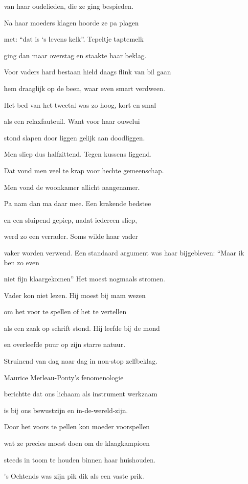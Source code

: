 van haar oudelieden,
die ze ging bespieden.

Na haar moeders klagen
hoorde ze pa plagen

met: “dat is ‘s levens kelk”.
Tepeltje taptemelk

ging dan maar overstag
en staakte haar beklag.

Voor vaders hard bestaan
hield daags flink van bil gaan

hem draaglijk op de been,
waar even smart verdween.

Het bed van het tweetal
was zo hoog, kort en smal

als een relaxfauteuil.
Want voor haar ouwelui

stond slapen door liggen
gelijk aan doodliggen.

Men sliep dus halfzittend.
Tegen kussens liggend.

Dat vond men veel te krap
voor hechte gemeenschap.

Men vond de woonkamer
allicht aangenamer.

Pa nam dan ma daar mee.
Een krakende bedstee

en een sluipend gepiep,
nadat iedereen sliep,

werd zo een verrader.
Soms wilde haar vader

vaker worden verwend.
Een standaard argument
was haar bijgebleven:
“Maar ik ben zo even

niet fijn klaargekomen”
Het moest nogmaals stromen.

Vader kon niet lezen.
Hij moest bij mam wezen

om het voor te spellen
of het te vertellen

als een zaak op schrift stond.
Hij leefde bij de mond

en overleefde puur
op zijn starre natuur.

Struinend van dag naar dag
in non-stop zelfbeklag.

Maurice Merleau-Ponty’s
fenomenologie

berichtte dat ons lichaam
als instrument werkzaam

is bij ons bewustzijn
en in-de-wereld-zijn.

Door het voors te pellen
kon moeder voorspellen

wat ze precies moest doen
om de klaagkampioen

steeds in toom te houden
binnen haar huishouden.

's Ochtends was zijn pik
dik als een vaste prik.


